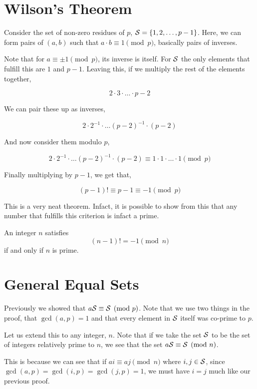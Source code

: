 \section{Wilson's Theorem}

Consider the set of non-zero residues of \(p\), \(\mathcal{S} = \left\{1, 2, \dots, p-1\right\}\).
Here, we can form pairs of \((a,b)\) such that \(a \cdot b \equiv 1 \pmod{p}\), 
basically pairs of inverses.

Note that for \(a \equiv \pm 1 \pmod{p}\), its inverse is itself.
For \(\mathcal{S}\) the only elements that fulfill this are \(1\) and \(p-1\).
Leaving this, if we multiply the rest of the elements together, 

\[2 \cdot 3 \cdot \dots \cdot p-2\]

We can pair these up as inverses,

\[2 \cdot 2^{-1} \cdot \dots (p-2)^{-1} \cdot (p-2)\]

And now consider them modulo \(p\),

\[2 \cdot 2^{-1} \cdot \dots (p-2)^{-1} \cdot (p-2) \equiv 1 \cdot 1 \cdot \dots \cdot 1 \pmod{p}\]

Finally multiplying by \(p-1\), we get that,

\[(p-1)! \equiv p-1 \equiv -1 \pmod{p}\]

This is a very neat theorem. Infact, it is possible to show from this that
any number that fulfills this criterion is infact a prime.

\begin{theorem}
    \label{thm: wilson}
    An integer \(n\) satisfies 
    \[(n-1)! = -1 \pmod{n}\]
    if and only if \(n\) is prime.
\end{theorem}

\section{General Equal Sets}

Previously we showed that \(a\mathcal{S} \equiv \mathcal{S} \pmod{p}\). Note that we use two things 
in the proof, that \(\gcd(a, p) = 1\) and that every element in \(\mathcal{S}\) itself was co-prime 
to \(p\). 

Let us extend this to any integer, \(n\). Note that if we take the set \(\mathcal{S}\) to be the 
set of integers relatively prime to \(n\), we see that the set \(a\mathcal{S} \equiv \mathcal{S} \pmod{n}\).

This is because we can see that if \(ai \equiv aj \pmod{n}\) where \(i, j \in \mathcal{S}\), 
since \(\gcd(a, p) = \gcd(i, p) = \gcd(j, p) = 1\), we must have \(i = j\) much like our previous 
proof. 

